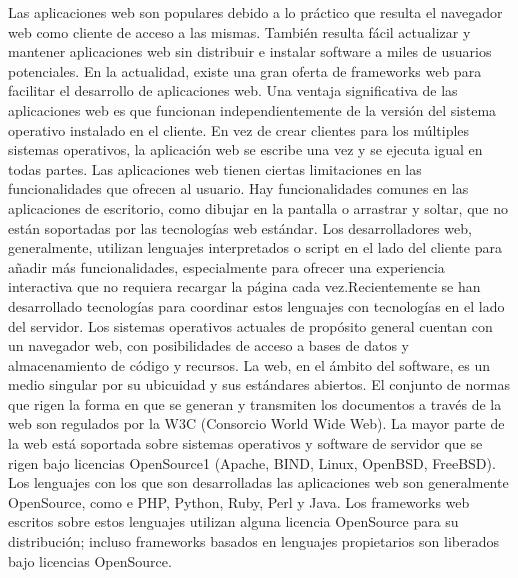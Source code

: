 \documentclass[a4paper]{report}
\begin{document}
Las aplicaciones web son populares debido a lo práctico que resulta el navegador web como cliente de acceso a las mismas.
También resulta fácil actualizar y mantener aplicaciones web sin distribuir e instalar software a miles de usuarios potenciales.
En la actualidad, existe una gran oferta de frameworks web para facilitar el desarrollo de aplicaciones web.
Una ventaja significativa de las aplicaciones web es que funcionan independientemente de la versión del sistema operativo instalado en el cliente.
En vez de crear clientes para los múltiples sistemas operativos, la aplicación web se escribe una vez y se ejecuta igual en todas partes.
Las aplicaciones web tienen ciertas limitaciones en las funcionalidades que ofrecen al usuario.
Hay funcionalidades comunes en las aplicaciones de escritorio, como dibujar en la pantalla o arrastrar y soltar, que no están soportadas por las tecnologías web estándar.
Los desarrolladores web, generalmente, utilizan lenguajes interpretados o script en el lado del cliente para añadir más funcionalidades, especialmente para ofrecer una experiencia interactiva que no requiera recargar la página cada vez.Recientemente se han desarrollado tecnologías para coordinar estos lenguajes con tecnologías en el lado del servidor.
Los sistemas operativos actuales de propósito general cuentan con un navegador web, con posibilidades de acceso a bases de datos y almacenamiento de código y recursos.
La web, en el ámbito del software, es un medio singular por su ubicuidad y sus estándares abiertos. El conjunto de normas que rigen la forma en que se generan y transmiten los documentos a través de la web son regulados por la W3C (Consorcio World Wide Web). La mayor parte de la web está soportada sobre sistemas operativos y software de servidor que se rigen bajo licencias OpenSource1 (Apache, BIND, Linux, OpenBSD, FreeBSD). Los lenguajes con los que son desarrolladas las aplicaciones web son generalmente OpenSource, como e PHP, Python, Ruby, Perl y Java. Los frameworks web escritos sobre estos lenguajes utilizan alguna licencia OpenSource para su distribución; incluso frameworks basados en lenguajes propietarios son liberados bajo licencias OpenSource.
\end{document}
